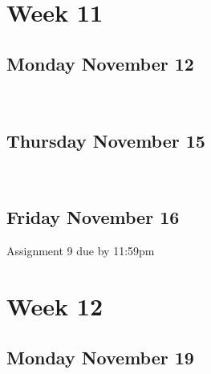 \documentclass[]{book}
\let\originaltabular\tabular
\let\endoriginaltabular\endtabular
\renewenvironment{tabular}[1]{%
  \begingroup%
  \centering%
  \originaltabular{#1}}%
  {\endoriginaltabular\endgroup}
\theoremstyle{definition}
\theoremstyle{definition}
\theoremstyle{definition}
\theoremstyle{remark}
\begin{document}
\section{Week 11}\label{week-11}

\subsection{Monday November 12}\label{monday-november-12}

\begin{table}[H]
\centering
\begin{tabular}{l}
\hline
\\
\hline
\end{tabular}
\end{table}

\subsection{Thursday November 15}\label{thursday-november-15}

\begin{table}[H]
\centering
\begin{tabular}{l}
\hline
\\
\hline
\end{tabular}
\end{table}

\subsection{Friday November 16}\label{friday-november-16}

\begin{table}[H]
\centering
\begin{tabular}{l}
\hline
Assignment 9 due by 11:59pm\\
\hline
\end{tabular}
\end{table}

\section{Week 12}\label{week-12}

\subsection{Monday November 19}\label{monday-november-19}

\begin{table}[H]
\centering
\begin{tabular}{l}
\hline
\\
\hline
\end{tabular}
\end{table}
\end{document}
